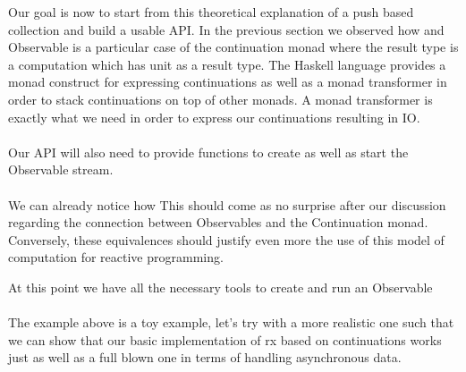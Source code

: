 
Our goal is now to start from this theoretical explanation of a push based collection and build a usable API. In the previous section we observed how and Observable is a particular case of the continuation monad where the result type is a computation which has unit as a result type. The Haskell language provides a monad construct for expressing continuations as well as a monad transformer in order to stack continuations on top of other monads. A monad transformer is exactly what we need in order to express our continuations resulting in IO.\\

\\

Our API will also need to provide functions to create as well as start the Observable stream.\\

\\

We can already notice how This should come as no surprise after our discussion regarding the connection between Observables and the Continuation monad. Conversely, these equivalences should justify even more the use of this model of computation for reactive programming.

At this point we have all the necessary tools to create and run an Observable\\

\\

The example above is a toy example, let's try with a more realistic one such that we can show that our basic implementation of rx based on continuations works just as well as a full blown one in terms of handling asynchronous data.\\ 

\\

